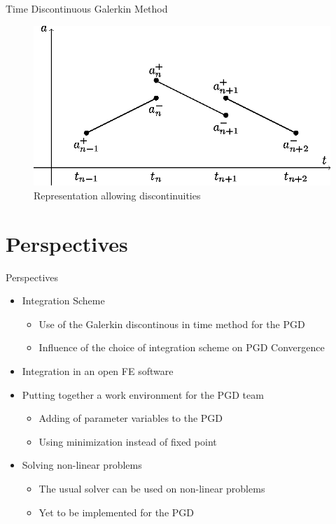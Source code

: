 \documentclass[10pt,a4paper]{beamer}
\begin{document}
\begin{frame}{Time Discontinuous Galerkin Method} 
	\begin{figure}
	\includegraphics[width=0.8\linewidth]{Courbe.Galerkin.DIY.eps}
		\caption{Representation allowing discontinuities}
	\end{figure}
\end{frame}

\section{Perspectives}

\begin{frame}{Perspectives}
	\begin{itemize}
		\item Integration Scheme
			\begin{itemize}
			\item Use of the Galerkin discontinous in time method for the PGD
			\item Influence of the choice of integration scheme on PGD Convergence
			\end{itemize}
		\item Integration in an open FE software
		\item Putting together a work environment for the PGD team
			\begin{itemize}
			\item Adding of parameter variables to the PGD %
			\item Using minimization instead of fixed point
			\end{itemize}
		\item Solving non-linear problems
			\begin{itemize}
			\item The usual solver can be used on non-linear problems
			\item Yet to be implemented for the PGD
			\end{itemize}
	\end{itemize}
\end{frame}
\end{document}
